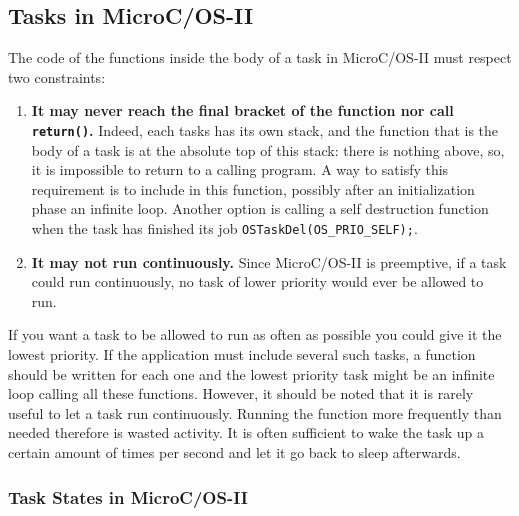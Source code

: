\subsection{Tasks in MicroC/OS-II}
The code of the functions inside the body of a task in MicroC/OS-II must respect two constraints:
\begin{enumerate}
	\item \textbf{It may never reach the final bracket of the function nor call \lstinline{return()}.} Indeed, each tasks has its own stack, and the function that is the body of a task is at the absolute top of this stack: there is nothing above, so, it is impossible to return to a calling program. A way to satisfy this requirement is to include in this function, possibly after an initialization phase an infinite loop. Another option is calling a self destruction function when the task has finished its job \texttt{OSTaskDel(OS\_PRIO\_SELF);}.
	\item \textbf{It may not run continuously.} Since  MicroC/OS-II is preemptive, if a task could run continuously, no task of lower priority would ever be allowed to run.
\end{enumerate}
If you want a task to be allowed to run as often as possible you could give it the lowest priority.
If the application must include several such tasks, a function should be written for each one and the lowest priority task might be an infinite loop calling all these functions.
However, it should be noted that it is rarely useful to let a task run continuously.
Running the function more frequently than needed therefore is wasted activity.
It is often sufficient to wake the task up a certain amount of times per second and let it go back to sleep afterwards.

\subsubsection{Task States in MicroC/OS-II}


